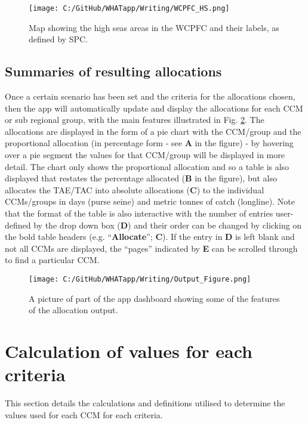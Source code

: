 \documentclass[11pt]{article}
\begin{document}
 \begin{figure} [h]
  \centering
\texttt{[image: C:/GitHub/WHATapp/Writing/WCPFC\_HS.png]}
  \caption {Map showing the high seas areas in the WCPFC and their labels, as defined by SPC.}
  \label{fig:HSfig}
\end{figure}

\subsection{Summaries of resulting allocations}
Once a certain scenario has been set and the criteria for the allocations chosen, then the app will automatically update and display the allocations for each CCM or sub regional group, with the main features illustrated in Fig. \ref{fig:outputpic}. The allocations are displayed in the form of a pie chart with the CCM/group and the proportional allocation (in percentage form - see {\bf A} in the figure) - by hovering over a pie segment the values for that CCM/group will be displayed in more detail. The chart only shows the proportional allocation and so a table is also displayed that restates the percentage allocated ({\bf B} in the figure), but also allocates the TAE/TAC into absolute allocations ({\bf C}) to the individual CCMs/groups in days (purse seine) and metric tonnes of catch (longline). Note that the format of the table is also interactive with the number of entries user-defined by the drop down box ({\bf D}) and their order can be changed by clicking on the bold table headers (e.g. ``{\bf Allocate}''; {\bf C}). If the entry in {\bf D} is left blank and not all CCMs are displayed, the ``pages'' indicated by {\bf E} can be scrolled through to find a particular CCM.

 \begin{figure} [h]
  \centering
\texttt{[image: C:/GitHub/WHATapp/Writing/Output\_Figure.png]}
  \caption {A picture of part of the app dashboard showing some of the features of the allocation output.}
  \label{fig:outputpic}
\end{figure}


\section{Calculation of values for each criteria} \label{sec:scendet}
This section details the calculations and definitions utilised to determine the values used for each CCM for each criteria. 
\end{document}
